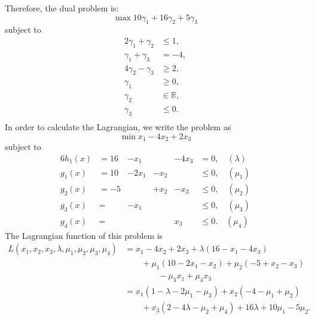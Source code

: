   
Therefore, the dual problem is: 
\begin{equation}
  \label{eq:dual1}
\max   10\gamma_1 + 16\gamma_2 + 5\gamma_3 
\end{equation}
subject to
\begin{equation}
  \label{eq:dualc1}
\begin{aligned}
2\gamma_1 + \gamma_2 &\leq 1, \\
\gamma_1 + \gamma_3 & =-4, \\
4\gamma_2 - \gamma_3 &\geq 2, \\
\gamma_1 & \geq 0, \\
\gamma_2 & \in \mathbb{R}, \\
\gamma_3 & \leq 0. \\
\end{aligned}
\end{equation}
In order to calculate the Lagrangian, we write the problem as $$\min x_1-4x_2+2x_3$$ subject to 
\begin{alignat*}{6}
h_1(x) & = 16 & - x_1 & & -4x_3 &= 0, \quad (\lambda)\\
g_1(x) &= 10 & -2x_1 & -x_2 & & \leq 0, \quad (\mu_1)\\
g_2(x) &= -5 & & +x_2 &-x_3 & \leq 0, \quad (\mu_2)\\
g_3(x) &= & -x_1 & & & \leq 0, \quad (\mu_3)\\
g_4(x) &= & & & x_3 & \leq 0. \quad (\mu_4)
\end{alignat*}
The Lagrangian function of this problem is 
\begin{align*}
L(x_1,x_2,x_3,\lambda, \mu_1, \mu_2, \mu_3, \mu_4)& = x_1-4x_2+2x_3 + \lambda(16-x_1-4x_3)\\ & \qquad +\mu_1(10-2x_1-x_2) + \mu_2(-5+x_2-x_3) \\& \qquad \qquad -\mu_3 x_1 + \mu_4 x_3\\
&= x_1(1-\lambda-2\mu_1-\mu_3) + x_2(-4-\mu_1+\mu_2)\\ & \qquad + x_3(2-4\lambda-\mu_2+\mu_4) + 16\lambda +10\mu_1 -5\mu_2.
\end{align*}

